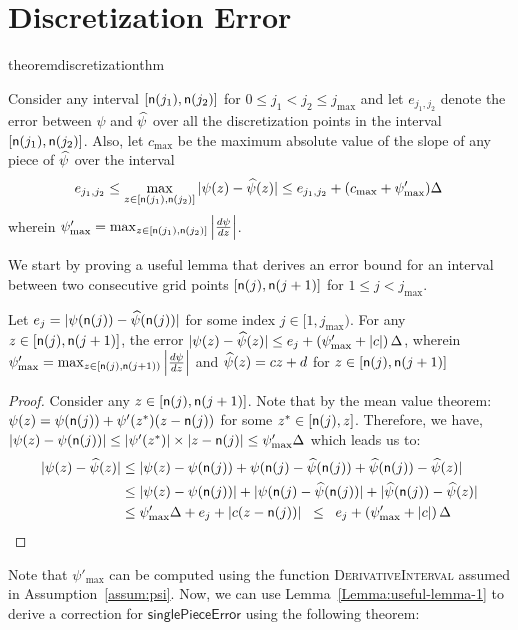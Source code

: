 \appendices
\section{Discretization Error}\label{app:discretization-correction-proof}
\begin{restatable}{theorem}{discretizationthm}

\label{thm:discretization-correction}
	Consider any interval $[\mathsf{n}(j_1), \mathsf{n}(j_2)]$ for $ 0 \leq j_1 < j_2 \leq j_{\max}$ and let $e_{j_1, j_2}$ denote the error between
	$\psi$ and $\widehat{\psi}$ over all the discretization points in the interval $[\mathsf{n}(j_1), \mathsf{n}(j_2)]$. Also, let $c_{\max}$ be the
	maximum absolute value of the slope of any piece of $\widehat{\psi}$ over the interval
	\begin{equation*}
	    e_{j_1, j_2} \leq \max_{z \in [\mathsf{n}(j_1), \mathsf{n}(j_2)]} | \psi(z) - \widehat{\psi}(z) | \leq e_{j_1, j_2} + (c_{\max} + \psi'_{\max}) \Delta\,
	\end{equation*}
	wherein $\psi'_{\max} = \max_{z \in [\mathsf{n}(j_1), \mathsf{n}(j_2)]} \left| \frac{d \psi}{dz} \right| $.
\end{restatable}
We start by proving a useful lemma that derives an error bound for an interval between two consecutive grid points $[\mathsf{n}(j), \mathsf{n}(j+1)]$ for $1 \leq j < j_{\max}$.
\begin{lemma}\label{Lemma:useful-lemma-1}
    Let $e_j = | \psi(\mathsf{n}(j)) - \widehat{\psi}(\mathsf{n}(j)) |$ for some index $j \in [1, j_{\max})$. For any $z \in [\mathsf{n}(j), \mathsf{n}(j+1)]$, the error $ | \psi(z) - \widehat{\psi}(z) | \leq e_j + \left( \psi'_{\max} + |c| \right) \Delta $, wherein $\psi'_{\max} = \max_{z \in [\mathsf{n}(j), \mathsf{n}(j+1))} \left| \frac{d \psi}{dz} \right|$ and $ \widehat{\psi}(z) = c z + d$ for $z \in  [\mathsf{n}(j), \mathsf{n}(j+1)]$
\end{lemma}
\begin{proof}
    Consider any $z \in [\mathsf{n}(j), \mathsf{n}(j+1)]$. Note that by the mean value theorem: $\psi(z) = \psi(\mathsf{n}(j)) + \psi'(z^*) (z - \mathsf{n}(j))$ for some $z^* \in [\mathsf{n}(j), z]$. Therefore, we have, $ | \psi(z) - \psi(\mathsf{n}(j))| \leq | \psi'(z^*)| \times  | z - \mathsf{n}(j)| \leq \psi'_{\max} \Delta$ which leads us to:
    \begin{align*}
        | \psi(z) - \widehat{\psi}(z) | 
            & \leq | \psi(z) - \psi(\mathsf{n}(j)) + \psi(\mathsf{n}(j) - \widehat{\psi}(\mathsf{n}(j)) + \widehat{\psi}(\mathsf{n}(j)) - \widehat{\psi}(z) | \\
		& \leq | \psi(z) - \psi(\mathsf{n}(j)) | + | \psi(\mathsf{n}(j) - \widehat{\psi}(\mathsf{n}(j)) | + |  \widehat{\psi}(\mathsf{n}(j)) - \widehat{\psi}(z) | \\
            & \leq \psi'_{\max} \Delta + e_j + | c (z - \mathsf{n}(j)) |\;\; \leq \;\; e_j + \left( \psi'_{\max} + |c| \right) \Delta \qedhere
	\end{align*}
\end{proof}
Note that $\psi'_{\max}$ can be computed using the function \textsc{DerivativeInterval} assumed in Assumption~\ref{assum:psi}. Now, we can use Lemma~\ref{Lemma:useful-lemma-1} to derive a correction for $\mathsf{singlePieceError}$ using the following theorem:

